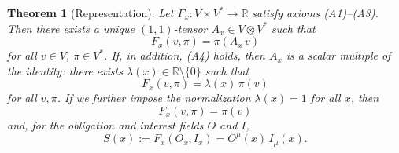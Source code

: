 \documentclass[12pt]{article}
\newtheorem{theorem}{Theorem}
\theoremstyle{remark}
\begin{document}
\begin{theorem}[Representation]
Let $F_x\colon V \times V^* \to \mathbb{R}$ satisfy axioms \emph{(A1)--(A3)}. Then there exists a unique $(1,1)$-tensor $A_x \in V \otimes V^*$ such that
\begin{equation}
    F_x(v, \pi) = \pi(A_x\, v)
\end{equation}
for all $v \in V$, $\pi \in V^*$. If, in addition, \emph{(A4)} holds, then $A_x$ is a scalar multiple of the identity: there exists $\lambda(x) \in \mathbb{R} \setminus \{0\}$ such that
\begin{equation}
    F_x(v, \pi) = \lambda(x)\, \pi(v)
\end{equation}
for all $v, \pi$. If we further impose the normalization $\lambda(x) = 1$ for all $x$, then
\begin{equation}
    F_x(v, \pi) = \pi(v)
\end{equation}
and, for the obligation and interest fields $O$ and $I$,
\begin{equation}
    S(x) := F_x(O_x, I_x) = O^\mu(x)\, I_\mu(x).
\end{equation}
\end{theorem}
\end{document}
